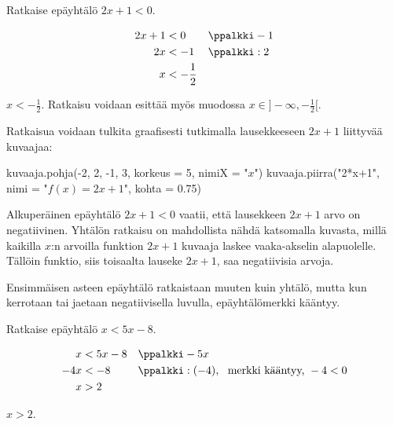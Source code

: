 \begin{esimerkki}
Ratkaise epäyhtälö $2x+1 < 0$.
\begin{esimratk}
\begin{align*}
2x+1 &< 0 && \ppalkki -1 \\
2x &< -1 && \ppalkki :2 \\
x &< -\frac{1}{2}
\end{align*}
\end{esimratk}
\begin{esimvast}
$x < -\frac{1}{2}$. 
Ratkaisu voidaan esittää myös muodossa $x \in ]-\infty, -\frac{1}{2}[$.
\end{esimvast}

Ratkaisua voidaan tulkita graafisesti tutkimalla lausekkeeseen $2x+1$ liittyvää kuvaajaa:

\begin{kuva}
kuvaaja.pohja(-2, 2, -1, 3, korkeus = 5, nimiX = "$x$")
kuvaaja.piirra("2*x+1", nimi = "$f(x) = 2x + 1$", kohta = 0.75)
\end{kuva}

Alkuperäinen epäyhtälö $2x+1<0$ vaatii, että lausekkeen $2x+1$ arvo on negatiivinen. Yhtälön ratkaisu on mahdollista nähdä katsomalla kuvasta, millä kaikilla $x$:n arvoilla funktion $2x+1$ kuvaaja laskee vaaka-akselin alapuolelle. Tällöin funktio, siis toisaalta lauseke $2x+1$, saa negatiivisia arvoja.
\end{esimerkki}

Ensimmäisen asteen epäyhtälö ratkaistaan muuten kuin yhtälö, mutta kun kerrotaan tai jaetaan negatiivisella luvulla, epäyhtälömerkki kääntyy.

\begin{esimerkki}
Ratkaise epäyhtälö $x < 5x-8$.
\begin{esimratk}
\begin{align*}
x &< 5x-8 && \ppalkki -5x \\
-4x &< -8 && \ppalkki :(-4), \ \ 
\text{merkki kääntyy, } -4 < 0 \\
x &> 2 &&
\end{align*}
\end{esimratk}
\begin{esimvast}
$x > 2$.
\end{esimvast}
\end{esimerkki}


